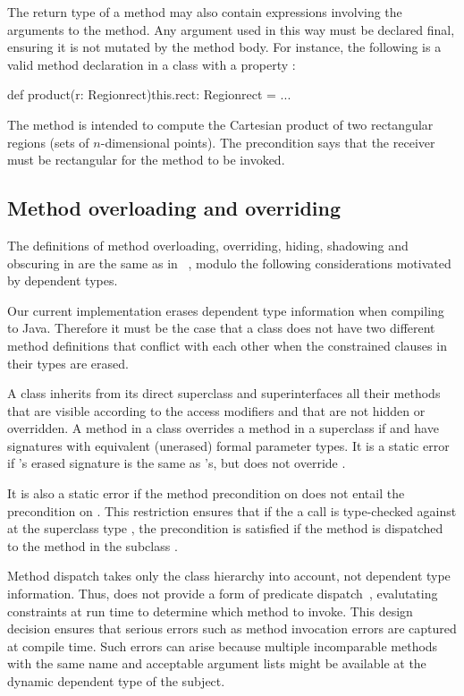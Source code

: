 The
return type of a method may also contain expressions involving the
arguments to the method.  Any argument used in this way must
be declared final,
ensuring it is not mutated by the method body.  For instance,
the following is a valid method declaration in a class
 with a  property :
\begin{xten}
def product(r: Region{rect}){this.rect}:
        Region{rect} = ...
\end{xten}
\noindent
The method is intended to compute the Cartesian product of two
rectangular regions (sets of $n$-dimensional points).
The precondition 
says that
the receiver must be rectangular for the method to be invoked.

\subsection{Method overloading and overriding}

The definitions of method overloading, overriding, hiding,
shadowing and obscuring in \Xten{} are the same as in
\Java~\cite{Java3}, modulo the following considerations
motivated by dependent types.

Our current implementation
erases dependent type information when compiling to Java. Therefore it
must be the case that a class does not have two different method
definitions that conflict with each other when the constrained
clauses in their types are erased.

A class  inherits from its direct superclass and
superinterfaces all their methods that are visible according to the access
modifiers and that are not hidden or overridden. A method
 in a class  overrides a method  in a
superclass  if  and  have signatures
with equivalent (unerased) formal parameter types.
It is a static error if 's erased signature is the same
as 's, but  does not override .

It is also a static error if the method precondition on  does
not entail the precondition on .  This restriction
ensures that if the a call
is type-checked against  at the superclass type ,
the precondition is satisfied if the method is dispatched to the
method  in the subclass .

Method dispatch takes only the class hierarchy into account, not 
dependent type information.  Thus, \Xten{} does not provide a
form
of predicate dispatch~\cite{predicateClasses,jpred}, 
evalutating constraints at run time to determine which method to
invoke.
This design decision ensures that
serious errors such as method invocation errors are captured at
compile time. Such errors can arise because multiple incomparable
methods with the same name and acceptable argument lists might be
available at the dynamic dependent type of the subject.

